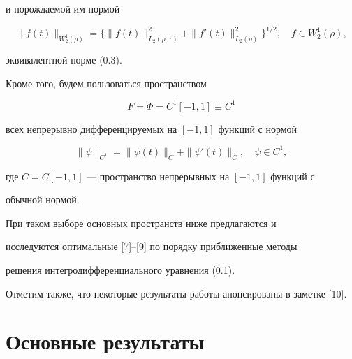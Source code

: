 и порождаемой им нормой


\begin{equation}


\|f(t)\|_{W_2^1(\rho)} = \big\{\|f(t)\|^2_{L_2(\rho^{-1})}+


\|f'(t)\|^2_{L_2(\rho)}\big\}^{1/2},\quad


f\in W_2^1(\rho),


\tag{0.6}


\end{equation}


эквивалентной норме (0.3).


Кроме того, будем пользоваться пространством 


\begin{equation}


F = \Phi = C^{1}[-1,1]\equiv C^1


\tag{0.7}


\end{equation}


всех непрерывно дифференцируемых на $[-1,1]$ функций с нормой 


\begin{equation}


\|\psi\|_{C^{1}} = \|\psi(t)\|_C+\|\psi'(t)\|_C,\quad \psi\in C^1,


\tag{0.8}


\end{equation}


где $C = C[-1,1]$ --- пространство непрерывных на $[-1,1]$ функций с 


обычной нормой. 





При таком выборе основных пространств ниже предлагаются и 


исследуются оптимальные [7]--[9] по порядку приближенные методы 


решения интегродифференциального уравнения (0.1). 





Отметим также, что некоторые результаты работы анонсированы в заметке [10].








\section{Основные результаты}





